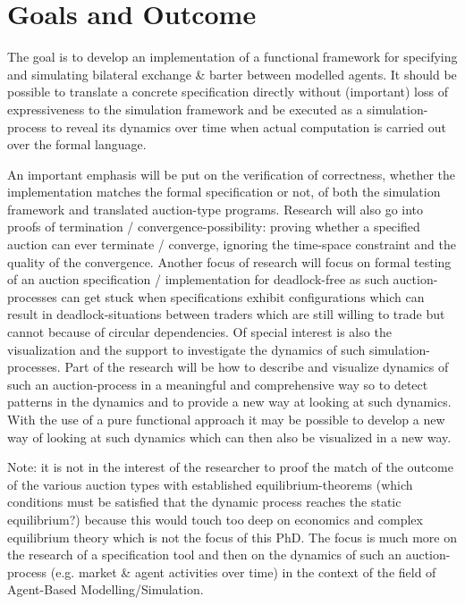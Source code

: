 \documentclass{article}
\begin{document}
\section{Goals and Outcome}
The goal is to develop an implementation of a functional framework for specifying and simulating bilateral exchange \& barter between modelled agents. It should be possible to translate a concrete specification directly without (important) loss of expressiveness to the simulation framework and be executed as a simulation-process to reveal its dynamics over time when actual computation is carried out over the formal language.

\bigskip

An important emphasis will be put on the verification of correctness, whether the implementation matches the formal specification or not, of both the simulation framework and translated auction-type programs.
Research will also go into proofs of termination / convergence-possibility: proving whether a specified auction can ever terminate / converge, ignoring the time-space constraint and the quality of the convergence. Another focus of research will focus on formal testing of an auction specification / implementation for deadlock-free as such auction-processes can get stuck when specifications exhibit configurations which can result in deadlock-situations between traders which are still willing to trade but cannot because of circular dependencies.
Of special interest is also the visualization and the support to investigate the dynamics of such simulation-processes. Part of the research will be how to describe and visualize dynamics of such an auction-process in a meaningful and comprehensive way so to detect patterns in the dynamics and to provide a new way at looking at such dynamics. With the use of a pure functional approach it may be possible to develop a new way of looking at such dynamics which can then also be visualized in a new way.

\bigskip

Note: it is not in the interest of the researcher to proof the match of the outcome of the various auction types with established equilibrium-theorems (which conditions must be satisfied that the dynamic process reaches the static equilibrium?) because this would touch too deep on economics and complex equilibrium theory which is not the focus of this PhD. The focus is much more on the research of a specification tool and then on the dynamics of such an auction- process (e.g. market \& agent activities over time) in the context of the field of Agent-Based Modelling/Simulation.
\end{document}
